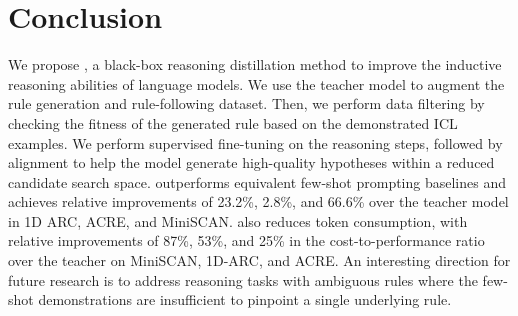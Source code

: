 \section{Conclusion}
We propose \proposed, a black-box reasoning distillation method to improve the inductive reasoning abilities of language models. We use the teacher model to augment the rule generation and rule-following dataset. Then, we perform data filtering by checking the fitness of the generated rule based on the demonstrated ICL examples. We perform supervised fine-tuning on the reasoning steps, followed by alignment to help the model generate high-quality hypotheses within a reduced candidate search space. \proposed outperforms equivalent few-shot prompting baselines and achieves relative improvements of 23.2\%, 2.8\%, and 66.6\% over the teacher model in 1D ARC, ACRE, and MiniSCAN. \proposed also reduces token consumption, with relative improvements of 87\%, 53\%, and 25\% in the cost-to-performance ratio over the teacher on MiniSCAN, 1D-ARC, and ACRE. An interesting direction for future research is to address reasoning tasks with ambiguous rules where the few-shot demonstrations are insufficient to pinpoint a single underlying rule. %

